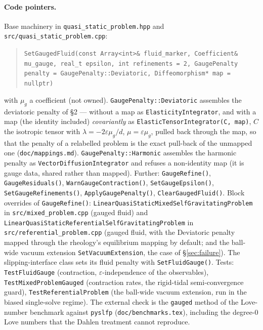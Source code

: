 \documentclass[11pt]{article}
\newcommand{\eps}{\varepsilon}
\begin{document}
\paragraph{Code pointers.}
Base machinery in \texttt{quasi\_static\_problem.hpp} and
\texttt{src/quasi\_static\_problem.cpp}:
\begin{quote}\small\raggedright
\texttt{SetGaugedFluid(const Array<int>\& fluid\_marker,
Coefficient\& mu\_gauge, real\_t epsilon, int refinements = 2,
GaugePenalty penalty = GaugePenalty::Deviatoric,
Diffeomorphism* map = nullptr)}
\end{quote}
with $\mu_g$ a coefficient (not owned). \texttt{GaugePenalty::Deviatoric}
assembles the deviatoric penalty of \S2 --- without a map as
\texttt{ElasticityIntegrator}, and with a map (the identity included)
\emph{covariantly} as \texttt{ElasticTensorIntegrator(C, map)}, $C$ the
isotropic tensor with $\lambda = -2\eps\mu_g/d$, $\mu = \eps\mu_g$, pulled
back through the map, so that the penalty of a relabelled problem is the
exact pull-back of the unmapped one (\texttt{doc/mappings.md}).
\texttt{GaugePenalty::Harmonic} assembles the harmonic penalty as
\texttt{VectorDiffusionIntegrator} and refuses a non-identity map (it is
gauge data, shared rather than mapped). Further:
\texttt{GaugeRefine()}, \texttt{GaugeResiduals()},
\texttt{WarnGaugeContraction()}, \texttt{SetGaugeEpsilon()},
\texttt{SetGaugeRefinements()}, \texttt{ApplyGaugePenalty()},
\texttt{ClearGaugedFluid()}. Block overrides of \texttt{GaugeRefine()}:
\texttt{LinearQuasiStaticMixedSelfGravitatingProblem} in
\texttt{src/mixed\_problem.cpp} (gauged fluid) and
\texttt{LinearQuasiStaticReferentialSelfGravitatingProblem} in
\texttt{src/referential\_problem.cpp} (gauged fluid, with the
Deviatoric penalty mapped through the rheology's equilibrium mapping by
default; and the ball-wide vacuum extension \texttt{SetVacuumExtension},
the case of \S\ref{sec:failure}). The slipping-interface class sets its
fluid penalty with \texttt{SetFluidGauge()}.
Tests: \texttt{TestFluidGauge} (contraction, $\eps$-independence of the
observables), \texttt{TestMixedProblemGauged} (contraction rates, the
rigid-tidal semi-convergence guard), \texttt{TestReferentialProblem}
(the ball-wide vacuum extension, run in the biased single-solve regime).
The external check is the \texttt{gauged} method of the Love-number
benchmark against \texttt{pyslfp} (\texttt{doc/benchmarks.tex}),
including the degree-0 Love numbers that the Dahlen treatment cannot
reproduce.
\end{document}
